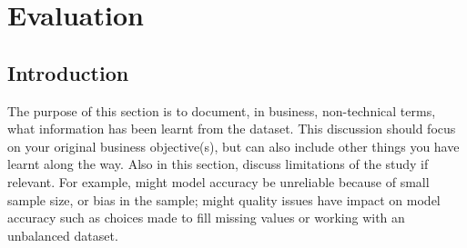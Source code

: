 \chapter{Evaluation}
\label{chpt:Eval}
\graphicspath{{Chapter5/Chapter5Figs/PNG/}{Chapter5/Chapter5Figs/PDF/}{Chapter5/Chapter5Figs/}}

\section{Introduction}

The purpose of this section is to document, in business, non-technical terms, what information has been learnt from the dataset. This discussion should focus on your original business objective(s), but can also include other things you have learnt along the way. 
Also in this section, discuss limitations of the study if relevant. For example, might model accuracy be unreliable because of small sample size, or bias in the sample; might quality issues have impact on model accuracy such as choices made to fill missing values or working with an unbalanced dataset.



